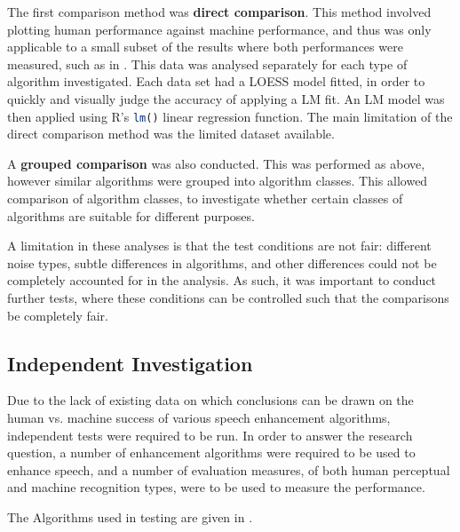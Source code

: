 The first comparison method was \textbf{direct comparison}. This method
involved plotting human performance against machine performance, and
thus was only applicable to a small subset of the results where both
performances were measured, such as in \citep{Paliwal2010}. This
data was analysed separately for each type of algorithm investigated.
Each data set had a \ac{LOESS} model fitted, in order to quickly
and visually judge the accuracy of applying a \ac{LM} fit. An \ac{LM}
model was then applied using R's \lstinline[language=R]!lm()! linear
regression function. The main limitation of the direct comparison
method was the limited dataset available.

A \textbf{grouped comparison} was also conducted. This was performed
as above, however similar algorithms were grouped into algorithm classes.
This allowed comparison of algorithm classes, to investigate whether
certain classes of algorithms are suitable for different purposes.

A limitation in these analyses is that the test conditions are not
fair: different noise types, subtle differences in algorithms, and
other differences could not be completely accounted for in the analysis.
As such, it was important to conduct further tests, where these conditions
can be controlled such that the comparisons be completely fair.


\subsection{\label{sub:Independent-Investigation-Meth}Independent Investigation}

Due to the lack of existing data on which conclusions can be drawn
on the human vs. machine success of various speech enhancement algorithms,
independent tests were required to be run. In order to answer the
research question, a number of enhancement algorithms were required
to be used to enhance speech, and a number of evaluation measures,
of both human perceptual and machine recognition types, were to be
used to measure the performance.

The Algorithms used in testing are given in .

